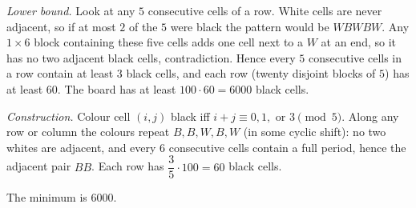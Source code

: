 \emph{Lower bound.} Look at any $5$ consecutive cells of a row. White cells are never adjacent, so if at most $2$ of the $5$ were black the pattern would be $WBWBW$. Any $1\times6$ block containing these five cells adds one cell next to a $W$ at an end, so it has no two adjacent black cells, contradiction. Hence every $5$ consecutive cells in a row contain at least $3$ black cells, and each row (twenty disjoint blocks of $5$) has at least $60$. The board has at least $100\cdot60=6000$ black cells.

\emph{Construction.} Colour cell $(i,j)$ black iff $i+j\equiv0,1,$ or $3\pmod5$. Along any row or column the colours repeat $B,B,W,B,W$ (in some cyclic shift): no two whites are adjacent, and every $6$ consecutive cells contain a full period, hence the adjacent pair $BB$. Each row has $\dfrac35\cdot100=60$ black cells.

The minimum is $\boxed{6000}$.
